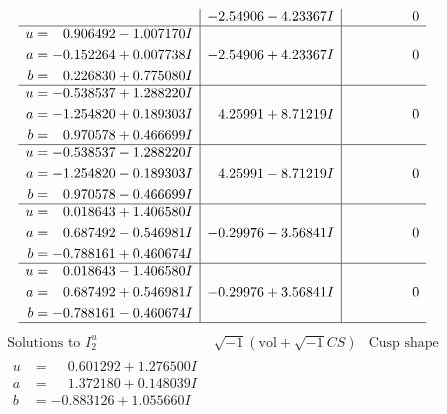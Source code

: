 \documentclass[1p]{elsarticle_modified}
\theoremstyle{definition}
\newcommand{\I}{\sqrt{-1}}
\begin{document}
$$\begin{array}{c|c|c}
 & -2.54906 - 4.23367 I & \phantom{-0.000000 } 0 \\ \hline\begin{aligned}
u &= \phantom{-}0.906492 - 1.007170 I \\
a &= -0.152264 + 0.007738 I \\
b &= \phantom{-}0.226830 + 0.775080 I\end{aligned}
 & -2.54906 + 4.23367 I & \phantom{-0.000000 } 0 \\ \hline\begin{aligned}
u &= -0.538537 + 1.288220 I \\
a &= -1.254820 + 0.189303 I \\
b &= \phantom{-}0.970578 + 0.466699 I\end{aligned}
 & \phantom{-}4.25991 + 8.71219 I & \phantom{-0.000000 } 0 \\ \hline\begin{aligned}
u &= -0.538537 - 1.288220 I \\
a &= -1.254820 - 0.189303 I \\
b &= \phantom{-}0.970578 - 0.466699 I\end{aligned}
 & \phantom{-}4.25991 - 8.71219 I & \phantom{-0.000000 } 0 \\ \hline\begin{aligned}
u &= \phantom{-}0.018643 + 1.406580 I \\
a &= \phantom{-}0.687492 - 0.546981 I \\
b &= -0.788161 + 0.460674 I\end{aligned}
 & -0.29976 - 3.56841 I & \phantom{-0.000000 } 0 \\ \hline\begin{aligned}
u &= \phantom{-}0.018643 - 1.406580 I \\
a &= \phantom{-}0.687492 + 0.546981 I \\
b &= -0.788161 - 0.460674 I\end{aligned}
 & -0.29976 + 3.56841 I & \phantom{-0.000000 } 0\\
 \hline 
 \end{array}$$\newpage$$\begin{array}{c|c|c}  
\text{Solutions to }I^u_{2}& \I (\text{vol} + \sqrt{-1}CS) & \text{Cusp shape}\\
 \hline 
\begin{aligned}
u &= \phantom{-}0.601292 + 1.276500 I \\
a &= \phantom{-}1.372180 + 0.148039 I \\
b &= -0.883126 + 1.055660 I\end{aligned}

\end{array}$$
\end{document}
